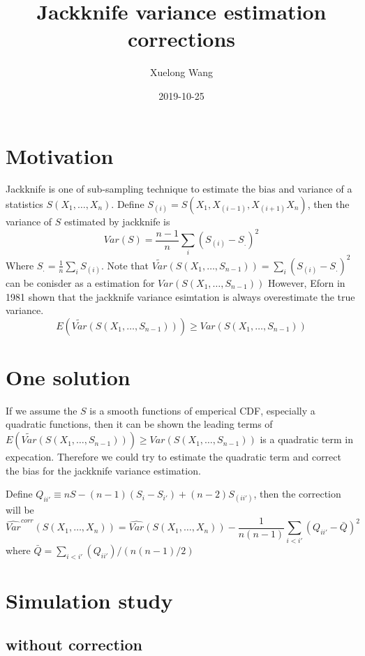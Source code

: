 \documentclass[]{article}
\title{Jackknife variance estimation corrections}
\author{Xuelong Wang}
\date{2019-10-25}
\begin{document}
\maketitle

{
\setcounter{tocdepth}{2}
\tableofcontents
}
\section{Motivation}\label{motivation}

Jackknife is one of sub-sampling technique to estimate the bias and
variance of a statistics \(S(X_1,\dots, X_n)\). Define
\(S_{(i)} = S(X_1,X_{(i-1)},X_{(i+1)} X_n)\), then the variance of \(S\)
estimated by jackknife is \[
Var(S) = \frac{n-1}{n}\sum_i(S_{(i)} - S_.)^2
\] Where \(S_. = \frac{1}{n}\sum_iS_{(i)}\). Note that
\(\tilde{Var}(S(X_1, \dots, S_{n-1})) = \sum_i(S_{(i)} - S_.)^2\) can be
conisder as a estimation for \(Var(S(X_1, \dots, S_{n-1}))\) However,
Eforn in 1981 shown that the jackknife variance esimtation is always
overestimate the true variance. \[
  E(\tilde{Var}(S(X_1, \dots, S_{n-1}))) \geq Var(S(X_1, \dots, S_{n-1}))
\]

\section{One solution}\label{one-solution}

If we assume the \(S\) is a smooth functions of emperical CDF,
especially a quadratic functions, then it can be shown the leading terms
of
\(E(\tilde{Var}(S(X_1, \dots, S_{n-1}))) \geq Var(S(X_1, \dots, S_{n-1}))\)
is a quadratic term in expecation. Therefore we could try to estimate
the quadratic term and correct the bias for the jackknife variance
estimation.

Define \(Q_{ii'} \equiv nS - (n-1)(S_{i} - S_{i'}) + (n-2)S_{(ii')}\),
then the correction will be \[
\hat{Var}^{corr}(S(X_1, \dots, X_n)) = \hat{Var}(S(X_1, \dots, X_n)) - \frac{1}{n(n-1)}\sum_{i < i'}(Q_{ii'}- \bar{Q})^2
\] where \(\bar{Q} = \sum_{i < i'}(Q_{ii'})/(n(n-1)/2)\)

\section{Simulation study}\label{simulation-study}

\subsection{without correction}\label{without-correction}
\end{document}
